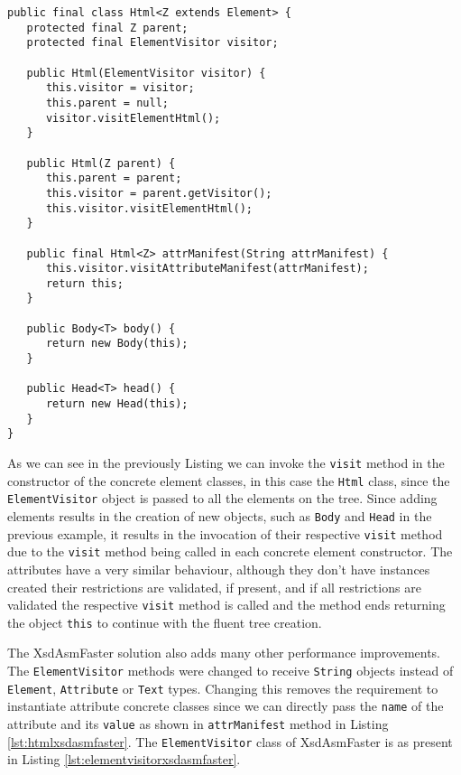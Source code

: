 \begin{minipage}{\linewidth}
\begin{lstlisting}[caption={Html class generated by XsdAsmFaster},label={lst:htmlxsdasmfaster}]
public final class Html<Z extends Element> {
   protected final Z parent;
   protected final ElementVisitor visitor;

   public Html(ElementVisitor visitor) {
      this.visitor = visitor;
      this.parent = null;
      visitor.visitElementHtml();
   }

   public Html(Z parent) {
      this.parent = parent;
      this.visitor = parent.getVisitor();
      this.visitor.visitElementHtml();
   }
   
   public final Html<Z> attrManifest(String attrManifest) {
      this.visitor.visitAttributeManifest(attrManifest);
      return this;
   }
   
   public Body<T> body() {
      return new Body(this);
   }
   
   public Head<T> head() {
      return new Head(this);
   }
}
\end{lstlisting}
\end{minipage}

\noindent
As we can see in the previously Listing we can invoke the \texttt{visit} method in the constructor of the concrete element classes, in this case the \texttt{Html} class, since the \texttt{ElementVisitor} object is passed to all the elements on the tree. Since adding elements results in the creation of new objects, such as \texttt{Body} and \texttt{Head} in the previous example, it results in the invocation of their respective \texttt{visit} method due to the \texttt{visit} method being called in each concrete element constructor. The attributes have a very similar behaviour, although they don't have instances created their restrictions are validated, if present, and if all restrictions are validated the respective \texttt{visit} method is called and the method ends returning the object \texttt{this} to continue with the fluent tree creation.

\noindent
The XsdAsmFaster solution also adds many other performance improvements. The \texttt{ElementVisitor} methods were changed to receive \texttt{String} objects instead of \texttt{Element}, \texttt{Attribute} or \texttt{Text} types. Changing this removes the requirement to instantiate attribute concrete classes since we can directly pass the \texttt{name} of the attribute and its \texttt{value} as shown in \texttt{attrManifest} method in Listing \ref{lst:htmlxsdasmfaster}. The \texttt{ElementVisitor} class of XsdAsmFaster is as present in Listing \ref{lst:elementvisitorxsdasmfaster}.

